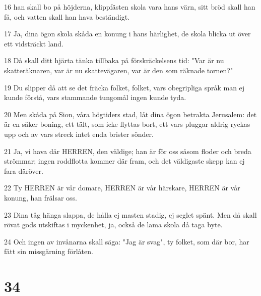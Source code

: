 \par 16 han skall bo på höjderna, klippfästen skola vara hans värn, sitt bröd skall han få, och vatten skall han hava beständigt.
\par 17 Ja, dina ögon skola skåda en konung i hans härlighet, de skola blicka ut över ett vidsträckt land.
\par 18 Då skall ditt hjärta tänka tillbaka på förskräckelsens tid: "Var är nu skatteräknaren, var är nu skattevägaren, var är den som räknade tornen?"
\par 19 Du slipper då att se det fräcka folket, folket, vars obegripliga språk man ej kunde förstå, vars stammande tungomål ingen kunde tyda.
\par 20 Men skåda på Sion, våra högtiders stad, låt dina ögon betrakta Jerusalem: det är en säker boning, ett tält, som icke flyttas bort, ett vars pluggar aldrig ryckas upp och av vars streck intet enda brister sönder.
\par 21 Ja, vi hava där HERREN, den väldige; han är för oss såsom floder och breda strömmar; ingen roddflotta kommer där fram, och det väldigaste skepp kan ej fara däröver.
\par 22 Ty HERREN är vår domare, HERREN är vår härskare, HERREN är vår konung, han frälsar oss.
\par 23 Dina tåg hänga slappa, de hålla ej masten stadig, ej seglet spänt. Men då skall rövat gods utskiftas i myckenhet, ja, också de lama skola då taga byte.
\par 24 Och ingen av invånarna skall säga: "Jag är svag", ty folket, som där bor, har fått sin missgärning förlåten.

\chapter{34}

